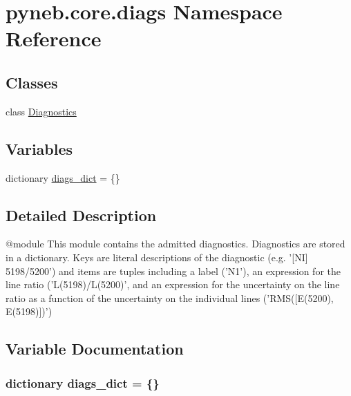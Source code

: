 \hypertarget{namespacepyneb_1_1core_1_1diags}{}\section{pyneb.\+core.\+diags Namespace Reference}
\label{namespacepyneb_1_1core_1_1diags}
\subsection*{Classes}
\begin{DoxyCompactItemize}
\item 
class \hyperlink{classpyneb_1_1core_1_1diags_1_1_diagnostics}{Diagnostics}
\end{DoxyCompactItemize}
\subsection*{Variables}
\begin{DoxyCompactItemize}
\item 
dictionary \hyperlink{namespacepyneb_1_1core_1_1diags_aefb25006cfca59ac33e32f4f36cf462b}{diags\+\_\+dict} = \{\}
\end{DoxyCompactItemize}


\subsection{Detailed Description}
\begin{DoxyVerb}@module
This module contains the admitted diagnostics.
Diagnostics are stored in a dictionary. Keys are literal descriptions of the diagnostic 
(e.g. '[NI] 5198/5200') and items are tuples including a label ('N1'), an expression for the line ratio ('L(5198)/L(5200)',
and an expression for the uncertainty on the line ratio as a function of the uncertainty on the individual lines ('RMS([E(5200), E(5198)])')\end{DoxyVerb}
 

\subsection{Variable Documentation}
\hypertarget{namespacepyneb_1_1core_1_1diags_aefb25006cfca59ac33e32f4f36cf462b}{}
\subsubsection[{diags\+\_\+dict}]{\setlength{\rightskip}{0pt plus 5cm}dictionary diags\+\_\+dict = \{\}}\label{namespacepyneb_1_1core_1_1diags_aefb25006cfca59ac33e32f4f36cf462b}
